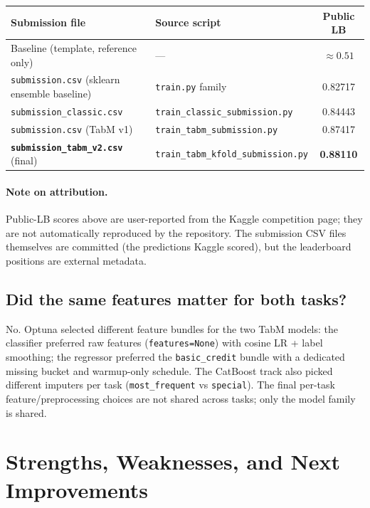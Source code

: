 \documentclass[11pt,a4paper]{article}
\begin{document}
\begin{table}[h]
\centering
\small
\begin{tabular}{llc}
\toprule
\textbf{Submission file} & \textbf{Source script} & \textbf{Public LB} \\
\midrule
Baseline (template, reference only) & --- & $\approx 0.51$ \\
\texttt{submission.csv} (sklearn ensemble baseline) & \texttt{train.py} family & 0.82717 \\
\texttt{submission\_classic.csv} & \texttt{train\_classic\_submission.py} & 0.84443 \\
\texttt{submission.csv} (TabM v1) & \texttt{train\_tabm\_submission.py} & 0.87417 \\
\textbf{\texttt{submission\_tabm\_v2.csv}} (final) & \texttt{train\_tabm\_kfold\_submission.py} & \textbf{0.88110} \\
\bottomrule
\end{tabular}
\end{table}

\paragraph{Note on attribution.} Public-LB scores above are user-reported from the Kaggle competition page; they are not automatically reproduced by the repository. The submission CSV files themselves are committed (the predictions Kaggle scored), but the leaderboard positions are external metadata.

\subsection{Did the same features matter for both tasks?}

No. Optuna selected different feature bundles for the two TabM models: the classifier preferred raw features (\texttt{features=None}) with cosine LR + label smoothing; the regressor preferred the \texttt{basic\_credit} bundle with a dedicated missing bucket and warmup-only schedule. The CatBoost track also picked different imputers per task (\texttt{most\_frequent} vs \texttt{special}). The final per-task feature/preprocessing choices are not shared across tasks; only the model family is shared.

\section{Strengths, Weaknesses, and Next Improvements}
\end{document}
